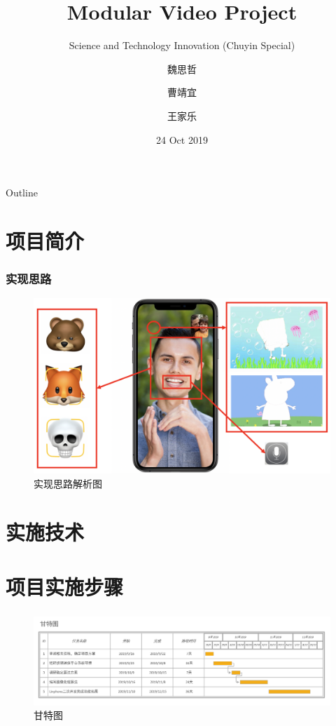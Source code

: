 \documentclass[xcolor=dvipsnames]{beamer}
\title{Modular Video Project}
\subtitle{Science and Technology Innovation (Chuyin Special)}
\author[03小组]
{魏思哲\and 曹靖宜\and 王家乐}
\institute[SJTU] %
{
  Department of Electronic Engineering\\
  Shanghai Jiao Tong University
}
\date{24 Oct 2019}
\begin{document}
\begin{frame}
  \titlepage
\end{frame}


\begin{frame}{Outline}
  \tableofcontents
\end{frame}

\section{项目简介}
\begin{frame}
  \frametitle{实现思路}
  \begin{figure}
    \centering
    \includegraphics[scale=0.4]{images/intro.png}
    \caption{实现思路解析图}
    \label{}
  \end{figure}
\end{frame}

\section{实施技术}
\begin{frame}
  
\end{frame}
\section{项目实施步骤}
\begin{frame}
  \frametitle{}
  \begin{figure}[]
    \centering
    \includegraphics[scale=0.50]{images/gante.jpg}
    \caption{甘特图}
    \label{}
  \end{figure}
\end{frame}
\end{document}
